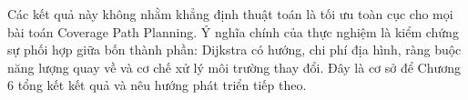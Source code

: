 \documentclass[../DoAn.tex]{subfiles}
\begin{document}
Các kết quả này không nhằm khẳng định thuật toán là tối ưu toàn cục cho mọi bài toán Coverage Path Planning. Ý nghĩa chính của thực nghiệm là kiểm chứng sự phối hợp giữa bốn thành phần: Dijkstra có hướng, chi phí địa hình, ràng buộc năng lượng quay về và cơ chế xử lý môi trường thay đổi. Đây là cơ sở để Chương 6 tổng kết kết quả và nêu hướng phát triển tiếp theo.
\end{document}
